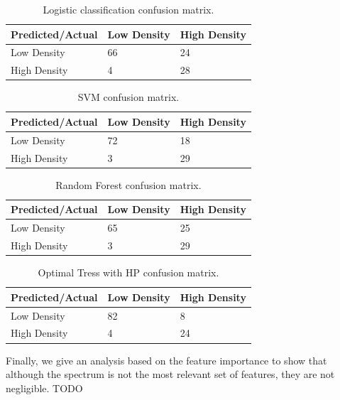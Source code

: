 \documentclass[letterpaper,11pt]{article}
\begin{document}
\begin{table}[!htb]
	\centering
	\begin{tabular}{l|ll}
		Predicted/Actual & Low Density & High Density \\ \hline
		Low Density      & 66          & 24           \\
		High Density     & 4           & 28          
	\end{tabular}
	\caption{Logistic classification confusion matrix.}
\end{table}

\begin{table}[!htb]
	\centering
	\begin{tabular}{l|ll}
		Predicted/Actual & Low Density & High Density \\ \hline
		Low Density      & 72          & 18           \\
		High Density     & 3           & 29          
	\end{tabular}
	\caption{SVM confusion matrix.}
\end{table}

\begin{table}[!htb]
	\centering
	\begin{tabular}{l|ll}
		Predicted/Actual & Low Density & High Density \\ \hline
		Low Density      & 65         & 25           \\
		High Density     & 3           & 29          
	\end{tabular}
	\caption{Random Forest confusion matrix.}
\end{table}

\begin{table}[!htb]
	\centering
	\begin{tabular}{l|ll}
		Predicted/Actual & Low Density & High Density \\ \hline
		Low Density      & 82         & 8           \\
		High Density     & 4           & 24          
	\end{tabular}
	\caption{Optimal Tress with HP confusion matrix.}
\end{table}

Finally, we give an analysis based on the feature importance to show that although the spectrum is not the most relevant set of features, they are not negligible. TODO
\end{document}
